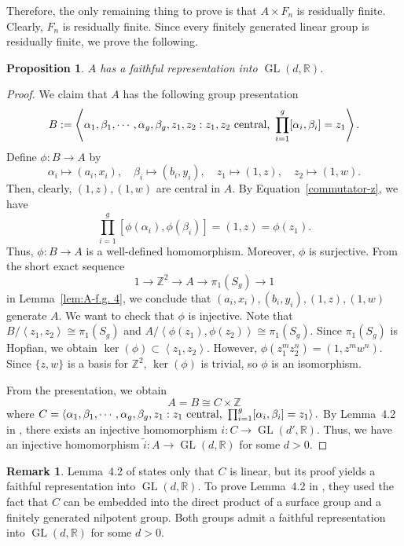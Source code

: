 \documentclass[11pt]{amsart}
\newtheorem{prop}[thm]{Proposition}
\theoremstyle{definition}
\newtheorem{rmk}[thm]{Remark}
\DeclareMathOperator{\GL}{GL}
\newcommand{\ZZ}{\mathbb{Z}}
\newcommand{\RR}{\mathbb{R}}
\begin{document}
Therefore, the only remaining thing to prove is that $A \times F_n$ is residually finite.
Clearly, $F_n$ is residually finite.
Since every finitely generated linear group is residually finite, we prove the following.

\begin{prop} \label{A-R representation}
 $A$ has a faithful representation into $\GL(d,\RR)$.
\end{prop}
\begin{proof}
  We claim that $A$ has the following group presentation
 $$ B := \left< \alpha_1,\beta_1, \cdots , \alpha_g,\beta_g,z_1,z_2 : z_1,z_2 \textnormal{ central, } \prod_{i=1}^g [\alpha_i,\beta_i]=z_1  \right >. $$
 Define $ \phi:B \to A $ by
 $$\alpha_i \mapsto (a_i,x_i), \quad \beta_i \mapsto (b_i,y_i), \quad z_1 \mapsto (1,z), \quad z_2 \mapsto (1,w).$$
 Then, clearly, $(1,z),(1,w)$ are central in $A$. 
 By Equation~\ref{commutator-z}, we have
 $$ \prod_{i=1}^g [\phi(\alpha_i),\phi(\beta_i)] = (1,z) = \phi(z_1). $$
 Thus, $\phi: B \to A$ is a well-defined homomorphism.
 Moreover, $\phi$ is surjective.
 From the short exact sequence $$ 1 \to \ZZ^2 \to A \to \pi_1(S_g) \to 1$$ in Lemma~\ref{lem:A-f.g. 4},
 we conclude that $(a_i,x_i), (b_i,y_i), (1,z), (1,w)$ generate $A$.
 We want to check that $\phi$ is injective.
 Note that $B/\left< z_1,z_2\right> \cong \pi_1(S_g)$ and 
 $A/\left< \phi(z_1),\phi(z_2) \right> \cong \pi_1(S_g)$.
 Since $\pi_1(S_g)$ is Hopfian, we obtain $\ker(\phi) \subset \left< z_1, z_2 \right>$.
 However, $\phi(z_1^m z_2^n)=(1,z^mw^n)$.
 Since $\{z,w\}$ is a basis for $\ZZ^2$, $\ker(\phi)$ is trivial, so $\phi$ is an isomorphism.

 From the presentation, we obtain 
 $$A = B \cong C \times \ZZ $$ where $C = \left< \alpha_1,\beta_1, \cdots , \alpha_g,\beta_g,z_1 : z_1 \textnormal{ central, } \prod_{i=1}^g [\alpha_i,\beta_i]=z_1  \right >.$
 By Lemma~4.2 in \cite{ye2025linearity}, there exists an injective homomorphism $i:C \to \GL(d',\RR)$.
 Thus, we have an injective homomorphism $\tilde{i}: A \to \GL(d,\RR)$ for some $d>0$.
\end{proof}

\begin{rmk}
 Lemma~4.2 of \cite{ye2025linearity} states only that $C$ is linear, but its proof yields a faithful representation into $\GL(d,\RR)$.
 To prove Lemma~4.2 in \cite{ye2025linearity}, they used the fact that $C$ can be embedded into the direct product of a surface group and a finitely generated nilpotent group.
 Both groups admit a faithful representation into $\GL(d,\RR)$ for some $d>0$.
\end{rmk}
\end{document}
